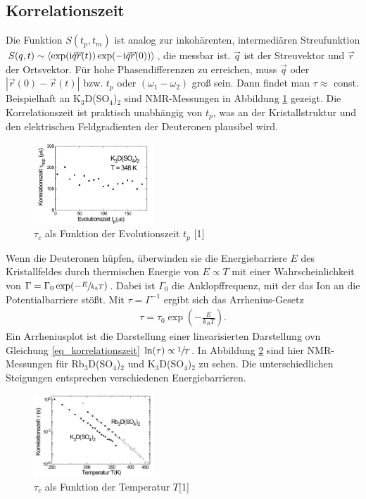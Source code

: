\subsection{Korrelationszeit}
Die Funktion $S(t_p,t_m)$ ist analog zur inkohärenten, intermediären Streufunktion 
$S(q,t) \sim \langle\exp(\text{i}\vec q \vec r(t))\exp(-\text{i}\vec q \vec r(0))\rangle$, die messbar ist. $\vec q$ ist der Streuvektor und $\vec r$ der Ortsvektor. Für
hohe Phasendifferenzen zu erreichen, muss $\vec q$ oder $|\vec r(0)-\vec r(t)|$ bzw. $t_p$ oder $(\omega_1-\omega_2)$ groß sein. Dann findet man $\tau \approx$
const. Beispielhaft an K$_3$D(SO$_4$)$_2$ sind NMR-Messungen in Abbildung \ref{pic_tau(tp)} gezeigt. Die Korrelationszeit ist praktisch unabhängig von $t_p$,
was an der Kristallstruktur und den elektrischen Feldgradienten der Deuteronen plausibel wird.
\begin{figure}[H]
 \includegraphics[width=0.4\textwidth]{../pics/tau(tp).jpg}
 \caption{$\tau_c$ als Funktion der Evolutionszeit $t_p$ [1]}
 \label{pic_tau(tp)}
\end{figure}
\noindent
Wenn die Deuteronen hüpfen, überwinden sie die Energiebarriere $E$ des Kristallfeldes durch thermischen Energie von $E \propto T$ mit einer Wahrscheinlichkeit
von $\Gamma = \Gamma_0 \exp(-\sfrac{E}{k_bT})$. Dabei ist $\Gamma_0$ die Anklopffrequenz, mit der das Ion an die Potentialbarriere stößt. Mit 
$\tau = \Gamma^{-1}$ ergibt sich das Arrhenius-Gesetz
\begin{align}
 \tau = \tau_0 \exp \left(-\frac{E}{k_BT}\right).
 \label{eq_korrelationszeit}
\end{align}
Ein Arrheniusplot ist die Darstellung einer linearisierten Darstellung ovn Gleichung \eqref{eq_korrelationszeit} $\ln(\tau) \propto \sfrac{1}{T}$.
In Abbildung \ref{pic_tau(T)} sind hier NMR-Messungen für Rb$_3$D(SO$_4$)$_2$ und K$_3$D(SO$_4$)$_2$ zu sehen. Die unterschiedlichen Steigungen entsprechen
verschiedenen Energiebarrieren.

\begin{figure}[H]
 \includegraphics[width=0.4\textwidth]{../pics/tau(T).jpg}
 \caption{$\tau_c$ als Funktion der Temperatur $T$[1]}
 \label{pic_tau(T)}
\end{figure}

